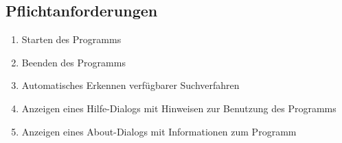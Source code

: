 \subsection{Pflichtanforderungen}
\begin{enumerate} [label=\bfseries /F \arabic*0/, leftmargin=*]
	\item Starten des Programms \label{f:programmstart}
	\item Beenden des Programms \label{f:beenden}
	\item Automatisches Erkennen verfügbarer Suchverfahren \label{f:erkennen_suchverfahren}
	\item Anzeigen eines Hilfe-Dialogs mit Hinweisen zur Benutzung des Programms \label{f:hilfe}
	\item Anzeigen eines About-Dialogs mit Informationen zum Programm \label{f:about}
	\newline
 

\end{enumerate}
